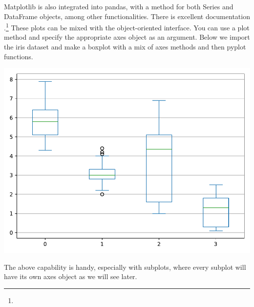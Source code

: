 Matplotlib is also integrated into pandas, with a  method for both Series and DataFrame objects, among other functionalities. There is excellent documentation .\footnote{} These plots can be mixed with the object-oriented interface. You can use a plot method and specify the appropriate axes object as an argument. Below we import the iris dataset and make a boxplot with a mix of axes methods and then pyplot functions. 


\begin{center}
    \includegraphics[width = .7\textwidth]{figures/proseplots/irisbox.pdf}
\end{center}

The above capability is handy, especially with subplots, where every subplot will have its own axes object as we will see later.  

